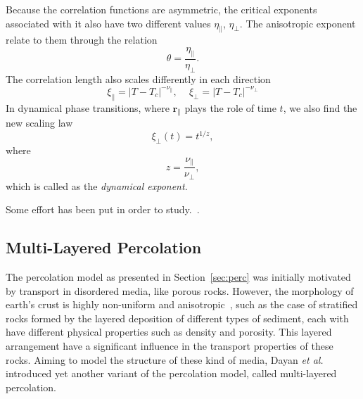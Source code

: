 Because the correlation functions are asymmetric, the critical exponents
associated with it also have two different values $\eta_\parallel$,
$\eta_\perp$. The anisotropic exponent relate to them through the relation
\begin{equation}
    \theta = \frac{\eta_\parallel}{\eta_\perp}.
\end{equation}
The correlation length also scales differently in each direction
\begin{equation}
    \xi_{\parallel}=
    \left|T-T_{c}\right|^{-\nu_{\parallel}},
    \,\,\,\,\,\,\,
    \xi_{\perp}=\left|T-T_{c}\right|^{-\nu_{\perp}}
\end{equation}
In dynamical phase transitions, where $\mathbf{r}_\parallel$ plays the role of
time $t$, we also find the new scaling law
\begin{equation}
    \xi_{\perp}\left(t\right)=t^{1/z},
\end{equation}
where
\begin{equation}
    z = \frac{\nu_\parallel}{\nu_\perp},
\end{equation}
which is called as the \textit{dynamical exponent}.

Some effort has been put in order to study.~\cite{Henkel1994}.



\subsection{Multi-Layered Percolation}
\label{sec:mlp}

The percolation model as presented in Section~\ref{sec:perc} was initially
motivated by transport in disordered media, like porous rocks. However, the
morphology of earth's crust is highly non-uniform and
anisotropic~\cite{Englman1986}, such as the case of stratified rocks formed by
the layered deposition of different types of sediment, each with have different
physical properties such as density and porosity. This layered arrangement have
a significant influence in the transport properties of these rocks. Aiming to
model the structure of these kind of media, Dayan \textit{et
al.}~\cite{Dayan1991} introduced yet another variant of the percolation
model, called multi-layered percolation. 

